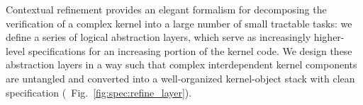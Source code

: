
Contextual refinement provides an elegant formalism for decomposing
the verification of a complex kernel into a large number of
small tractable tasks: we define a series of logical abstraction
layers, which serve as increasingly higher-level specifications
for an increasing portion of the kernel code. We design
these abstraction layers in a way such that complex
interdependent kernel components are untangled and converted
into a well-organized kernel-object stack with clean
specification (\cf ~Fig.~\ref{fig:spec:refine_layer}). 

